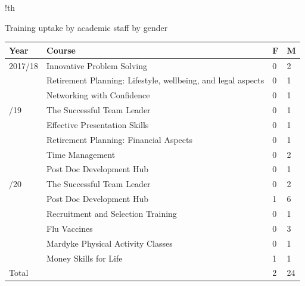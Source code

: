 
\begin{tabbox}{!th}
    \footnotesize 
    \caption{Training uptake by academic staff by gender}
    \label{tab:training:academic}
    
    \begin{tabular}{p{2cm}
                    p{9.5cm}
                    !{\qquad}
                    R{1cm}
                    R{1cm}}
    
    \toprule 
    Year & Course & F & M \\
    \midrule
    
    2017/18 &  Innovative Problem Solving & 0 & 2\\
    & Retirement Planning: Lifestyle, wellbeing, and legal aspects & 0 & 1\\
    &  Networking with Confidence & 0 & 1\\
    /19 &  The Successful Team Leader & 0 & 1\\
    & Effective Presentation Skills & 0 & 1 \\
    & Retirement Planning: Financial Aspects & 0 & 1 \\
    & Time Management & 0 & 2 \\
    & Post Doc Development Hub & 0 & 1 \\
    /20 & The Successful Team Leader & 0 & 2 \\
    & Post Doc Development Hub  & 1 & 6 \\
    & Recruitment and Selection Training & 0 & 1 \\
    & Flu Vaccines & 0 & 3\\
    & Mardyke Physical Activity Classes  & 0 & 1\\
    & Money Skills for Life & 1 & 1\\
    \midrule 
    Total & & 2 & 24 \\
    
    \bottomrule      
         
    \end{tabular}
\end{tabbox}


